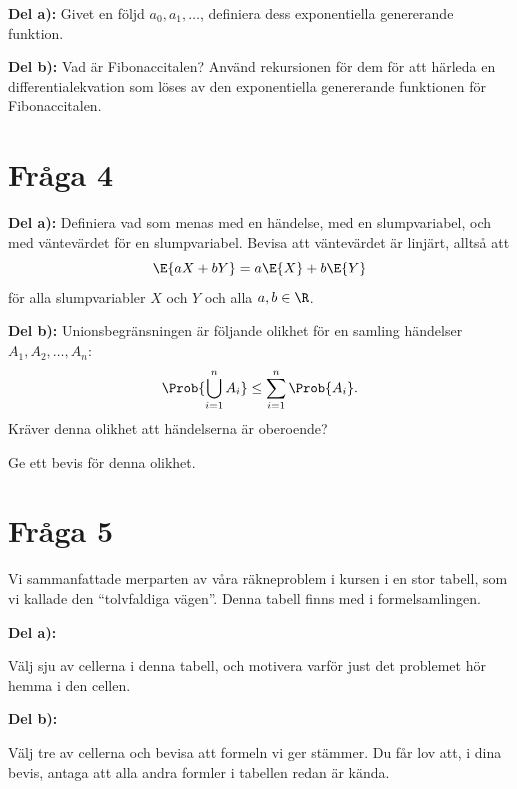 \documentclass[nobib]{tufte-handout}
\begin{document}
\textbf{Del a):} Givet en följd $a_0, a_1, \ldots$, definiera dess exponentiella genererande funktion.

\noindent\textbf{Del b):} Vad är Fibonaccitalen? Använd rekursionen för dem för att härleda en differentialekvation som löses av den exponentiella genererande funktionen för Fibonaccitalen.

\section{Fråga 4} %

\textbf{Del a):} Definiera vad som menas med en händelse, med en slumpvariabel, och med väntevärdet för en slumpvariabel. Bevisa att väntevärdet är linjärt, alltså att
$$\E{aX + bY} = a\E{X} + b\E{Y}$$
för alla slumpvariabler $X$ och $Y$ och alla $a, b \in \R$.

\noindent\textbf{Del b):} Unionsbegränsningen är följande olikhet för en samling händelser $A_1, A_2, \ldots, A_n$:
$$\Prob{\bigcup_{i=1}^n A_i} \leq \sum_{i=1}^{n} \Prob{A_i}.$$
Kräver denna olikhet att händelserna är oberoende?

Ge ett bevis för denna olikhet.

\section{Fråga 5} %

Vi sammanfattade merparten av våra räkneproblem i kursen i en stor tabell, som vi kallade den ``tolvfaldiga vägen''. Denna tabell finns med i formelsamlingen.

\noindent\textbf{Del a):}

Välj sju av cellerna i denna tabell, och motivera varför just det problemet hör hemma i den cellen.

\noindent\textbf{Del b):}

Välj tre av cellerna och bevisa att formeln vi ger stämmer. Du får lov att, i dina bevis, antaga att alla andra formler i tabellen redan är kända.
\end{document}
